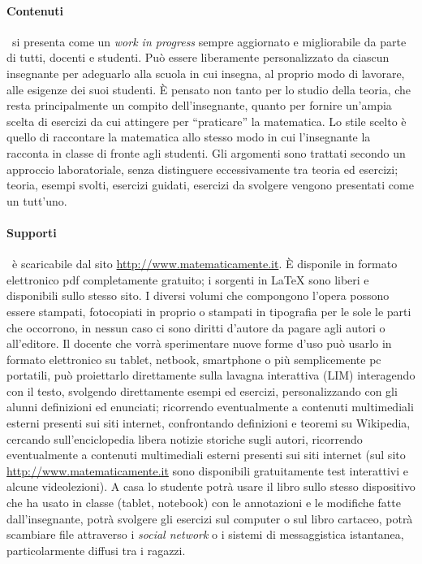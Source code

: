 \paragraph{Contenuti} \serie\ si presenta come un \textit{work in progress} sempre aggiornato e migliorabile da parte
di tutti, docenti e studenti. Può essere liberamente personalizzato da ciascun insegnante per adeguarlo alla
scuola in cui insegna, al proprio modo di lavorare, alle esigenze dei suoi studenti. È pensato non tanto per lo
studio della teoria, che resta principalmente un compito dell'insegnante, quanto per fornire un'ampia scelta di
esercizi da cui attingere per ``praticare'' la matematica. Lo stile scelto è quello di raccontare la matematica
allo stesso modo in cui l'insegnante la racconta in classe di fronte agli studenti. Gli
argomenti sono trattati secondo un approccio laboratoriale, senza distinguere eccessivamente tra teoria ed
esercizi; teoria, esempi svolti, esercizi guidati, esercizi da svolgere vengono presentati come un tutt'uno.

\paragraph{Supporti}
\serie\ è scaricabile dal sito \url{http://www.matematicamente.it}. È disponile in formato elettronico
pdf completamente gratuito; i sorgenti in {\LaTeX} sono liberi e disponibili sullo stesso sito. I diversi volumi che compongono l'opera
possono essere stampati, fotocopiati in proprio o stampati in tipografia per le sole le parti che occorrono, in
nessun caso ci sono diritti d'autore da pagare agli autori o all'editore. Il docente che vorrà sperimentare
nuove forme d'uso può usarlo in formato elettronico su tablet, netbook, smartphone o più semplicemente pc portatili,
può proiettarlo direttamente sulla lavagna interattiva (LIM) interagendo con il testo, svolgendo direttamente
esempi ed esercizi, personalizzando con gli alunni definizioni ed enunciati; ricorrendo eventualmente a
contenuti multimediali esterni presenti sui siti internet, confrontando definizioni e teoremi su Wikipedia,
cercando sull'enciclopedia libera notizie storiche sugli autori, ricorrendo eventualmente a contenuti multimediali
esterni presenti sui siti internet (sul sito \url{http://www.matematicamente.it} sono disponibili gratuitamente test interattivi
e alcune videolezioni). A casa lo studente potrà usare il libro sullo
stesso dispositivo che ha usato in classe (tablet, notebook) con le annotazioni e le modifiche fatte
dall'insegnante, potrà svolgere gli esercizi sul computer o sul libro cartaceo, potrà scambiare file attraverso i \textit{social network}
o i sistemi di messaggistica istantanea, particolarmente diffusi tra i ragazzi.

